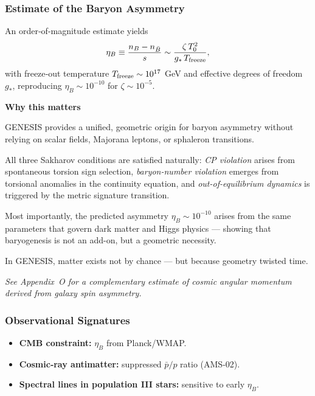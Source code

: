 \documentclass{article}
\begin{document}
\subsubsection{ Estimate of the Baryon Asymmetry}
An order‐of‐magnitude estimate yields
\begin{equation}\label{eq:auto169}
\eta_B \equiv \frac{n_B - n_{\bar B}}{s}
  \sim \frac{\zeta\,T_0^2}{g_*\,T_{\rm freeze}},
\end{equation}
with freeze‐out temperature \(T_{\rm freeze}\sim10^{17}\) GeV and 
effective degrees of freedom \(g_*\), reproducing \(\eta_B\sim10^{-10}\)
for \(\zeta\sim10^{-5}\).



\begin{tcolorbox}[
  colback=white,
  colframe=black!30,
  boxrule=0.3pt,
  arc=2pt,
  left=6pt,
  right=6pt,
  top=4pt,
  bottom=4pt,
  enhanced
]
\textbf{Why this matters} \\
\vspace{2pt}
\begin{minipage}{0.92\linewidth}

GENESIS provides a unified, geometric origin for baryon asymmetry without relying on scalar fields, Majorana leptons, or sphaleron transitions. 

All three Sakharov conditions are satisfied naturally: \emph{CP violation} arises from spontaneous torsion sign selection, \emph{baryon-number violation} emerges from torsional anomalies in the continuity equation, and \emph{out-of-equilibrium dynamics} is triggered by the metric signature transition.

Most importantly, the predicted asymmetry $\eta_B \sim 10^{-10}$ arises from the same parameters that govern dark matter and Higgs physics — showing that baryogenesis is not an add-on, but a geometric necessity.

In GENESIS, matter exists not by chance — but because geometry twisted time.
\end{minipage}
\end{tcolorbox}

\vspace{0.5em}
\noindent
\textit{See Appendix~O for a complementary estimate of cosmic angular momentum derived from galaxy spin asymmetry.}





\subsubsection{ Observational Signatures}
\begin{itemize}
  \item \textbf{CMB constraint:} \(\eta_B\) from Planck/WMAP.  
  \item \textbf{Cosmic‐ray antimatter:} suppressed \(\bar p/p\) ratio (AMS-02).  
  \item \textbf{Spectral lines in population III stars:} sensitive to early \(\eta_B\).
\end{itemize}
\end{document}

